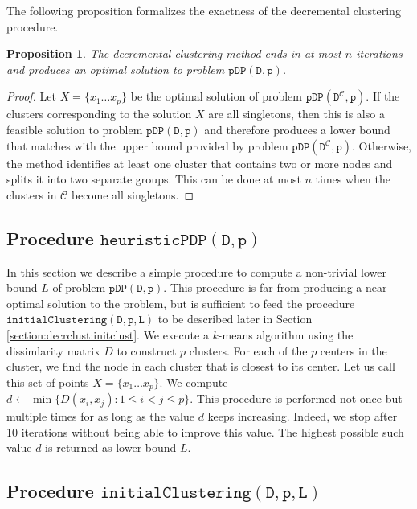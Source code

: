 \documentclass[a4paper,10pt]{article}
\newtheorem{proposition}{\sffamily Proposition}
\newcommand{\pdp}[2]{$\mathtt{pDP({#1}, {#2})}$}
\newcommand{\mC}{\mathcal{C}}
\newcommand{\DmC}{D^{\mC}}
\newcommand{\hpdp}[2]{$\mathtt{heuristicPDP({#1}, {#2})}$}
\newcommand{\initclust}[3]{$\mathtt{initialClustering({#1}, {#2}, {#3})}$}
\begin{document}
The following proposition formalizes the exactness of the decremental clustering procedure.

\begin{proposition}
	The decremental clustering method ends in at most $n$ iterations and produces an optimal solution to problem \pdp{D}{p}.
\end{proposition}
\begin{proof}
	Let $X = \{x_1\ldots x_p\}$ be the optimal solution of problem \pdp{\DmC}{p}. If the clusters corresponding to the solution $X$ are all singletons, then this is also a feasible solution to problem \pdp{D}{p} and therefore produces a lower bound that matches with the upper bound provided by problem \pdp{\DmC}{p}. Otherwise, the method identifies at least one cluster that contains two or more nodes and splits it into two separate groups. This can be done at most $n$ times when the clusters in $\mC$ become all singletons.
\end{proof}

\subsection{Procedure \hpdp{D}{p}\label{section:decrclust:hpdp}}

In this section we describe a simple procedure to compute a non-trivial lower bound $L$ of problem \pdp{D}{p}. This procedure is far from producing a near-optimal solution to the problem, but is sufficient to feed the procedure \initclust{D}{p}{L} to be described later in Section \ref{section:decrclust:initclust}. We execute a $k$-means algorithm using the dissimlarity matrix $D$ to construct $p$ clusters. For each of the $p$ centers in the cluster, we find the node in each cluster that is closest to its center. Let us call this set of points $X = \{x_1\ldots x_p\}$. We compute $d\leftarrow \min\{D(x_i, x_j): 1\leq i < j \leq p\}$. This procedure is performed not once but multiple times for as long as the value $d$ keeps increasing. Indeed, we stop after 10 iterations without being able to improve this value. The highest possible such value $d$ is returned as lower bound $L$.

\subsection{Procedure \initclust{D}{p}{L}\label{section:decrclust:initclust}}
\end{document}
